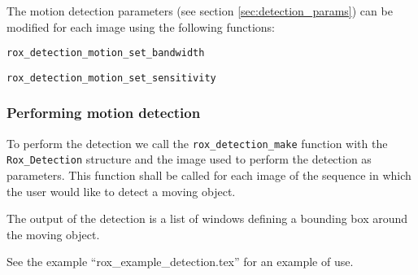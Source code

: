 The motion detection parameters (see section \ref{sec:detection_params}) can be modified for each image using the following functions:

\lstinline$rox_detection_motion_set_bandwidth$

\lstinline$rox_detection_motion_set_sensitivity$



\subsubsection{Performing motion detection}
\label{sss:detection_set_params}

To perform the detection we call the \lstinline$rox_detection_make$
function with the \lstinline$Rox_Detection$ structure and the image
used to perform the detection as parameters. This function shall be
called for each image of the sequence in which the user would like to
detect a moving object.

The output of the detection is a list of windows defining a bounding
box around the moving object.

See the example ``rox\_example\_detection.tex'' for an example of use.

%
